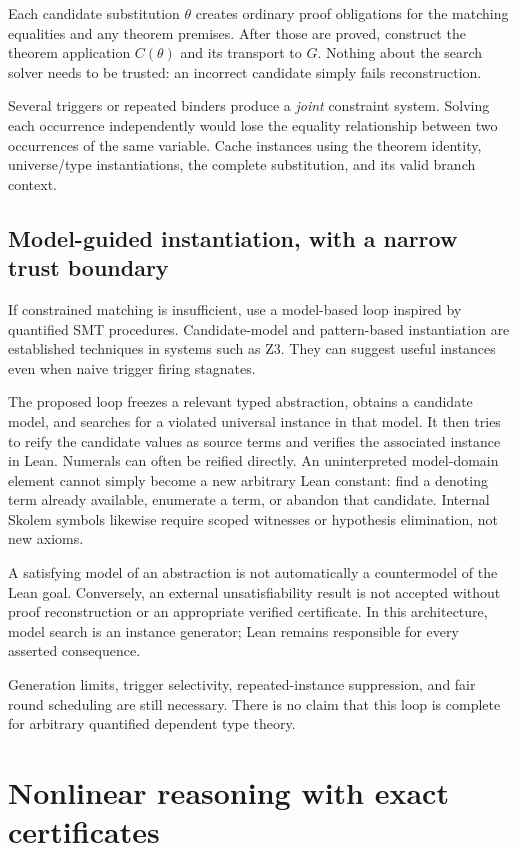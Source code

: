 Each candidate substitution $\theta$ creates ordinary proof obligations for
the matching equalities and any theorem premises. After those are proved,
construct the theorem application $C(\theta)$ and its transport to $G$.
Nothing about the search solver needs to be trusted: an incorrect candidate
simply fails reconstruction.

Several triggers or repeated binders produce a \emph{joint} constraint system.
Solving each occurrence independently would lose the equality relationship
between two occurrences of the same variable. Cache instances using the
theorem identity, universe/type instantiations, the complete substitution,
and its valid branch context.

\subsection{Model-guided instantiation, with a narrow trust boundary}

If constrained matching is insufficient, use a model-based loop inspired by
quantified SMT procedures. Candidate-model and pattern-based instantiation
are established techniques in systems such as Z3.\cite{z3quant} They can
suggest useful instances even when naive trigger firing stagnates.

The proposed loop freezes a relevant typed abstraction, obtains a candidate
model, and searches for a violated universal instance in that model. It then
tries to reify the candidate values as source terms and verifies the associated
instance in Lean. Numerals can often be reified directly. An uninterpreted
model-domain element cannot simply become a new arbitrary Lean constant:
find a denoting term already available, enumerate a term, or abandon that
candidate. Internal Skolem symbols likewise require scoped witnesses or
hypothesis elimination, not new axioms.

A satisfying model of an abstraction is not automatically a countermodel of
the Lean goal. Conversely, an external unsatisfiability result is not accepted
without proof reconstruction or an appropriate verified certificate. In this
architecture, model search is an instance generator; Lean remains responsible
for every asserted consequence.

Generation limits, trigger selectivity, repeated-instance suppression, and
fair round scheduling are still necessary. There is no claim that this loop
is complete for arbitrary quantified dependent type theory.

\section{Nonlinear reasoning with exact certificates}

